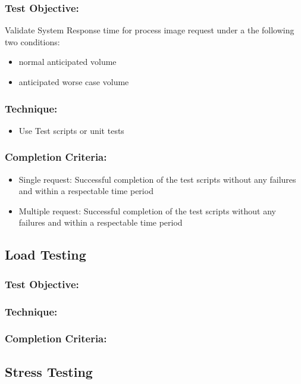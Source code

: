 \documentclass[a4paper,12pt]{report}
\begin{document}
			\subsubsection {Test Objective:}
					Validate System Response time for process image request under a the following two conditions:
					\begin {itemize}
						\item normal anticipated volume
						\item anticipated worse case volume
					\end {itemize}
			\subsubsection {Technique:}
				\begin {itemize}
					\item Use Test scripts or unit tests 
				\end {itemize}
			\subsubsection {Completion Criteria:}
				\begin {itemize}
					\item Single request: Successful completion of the test scripts without any failures and within a respectable time period
					\item Multiple request: Successful completion of the test scripts without any failures and within a respectable time period
				\end {itemize}
				
		\subsection {Load Testing}
			\subsubsection {Test Objective:}
			\subsubsection {Technique:}
			\subsubsection {Completion Criteria:}
			
		\subsection {Stress Testing}
\end{document}
